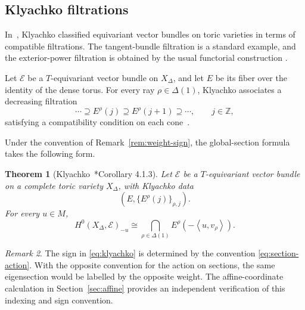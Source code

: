 \documentclass[colorlinks,11pt,reqno]{amsart}
\newtheorem{theorem}{Theorem}[section]
\theoremstyle{definition}
\theoremstyle{remark}
\newtheorem{remark}[theorem]{Remark}
\numberwithin{equation}{section}
\numberwithin{equation}{section}
\newcommand{\cE}{\mathcal{E}}
\newcommand{\Pair}[2]{\left\langle #1,#2\right\rangle}
\newcommand{\Z}{\mathbb{Z}}
\begin{document}
\subsection{Klyachko filtrations}\label{subsec:klyachko}

In~\cite{Klyachko}, Klyachko classified equivariant vector
bundles on toric varieties in terms of compatible filtrations. The tangent-bundle filtration is a standard example, and the exterior-power filtration is obtained by the usual
functorial construction \cites{Gonzalez, Klyachko}.

Let \(\cE\) be a \(T\)-equivariant vector bundle on \(X_\Delta\), and let \(E\) be its fiber over the identity of the dense torus. For every ray \(\rho\in\Delta(1)\), Klyachko associates a decreasing filtration
\[
\cdots\supseteq E^\rho(j) \supseteq E^\rho(j+1) \supseteq\cdots,   \qquad j\in \Z,
\]
satisfying a compatibility condition on each cone~\cite{Klyachko}.

Under the convention of Remark~\ref{rem:weight-sign}, the global-section formula takes the following form.
\begin{theorem}[Klyachko~\cite{Klyachko}*{Corollary 4.1.3}]\label{thm:klyachko}
Let \(\cE\) be a \(T\)-equivariant vector bundle on a complete toric
variety \(X_\Delta\), with Klyachko data
\[
\left(E,\{E^\rho(j)\}_{\rho,j}\right).
\]
For every \(u\in M\),
\begin{equation}\label{eq:klyachko}
H^0(X_\Delta,\cE)_{-u} \cong \bigcap_{\rho\in\Delta(1)}
E^\rho\!\left(-\Pair{u}{v_\rho}\right).
\end{equation}
\end{theorem}


\begin{remark}
The sign in \eqref{eq:klyachko} is determined by the convention \eqref{eq:section-action}. With the opposite convention for the action on sections, the same eigensection would be labelled by the
opposite weight. The affine-coordinate calculation in Section~\ref{sec:affine} provides an independent verification of this indexing and sign convention.
\end{remark}
\end{document}
